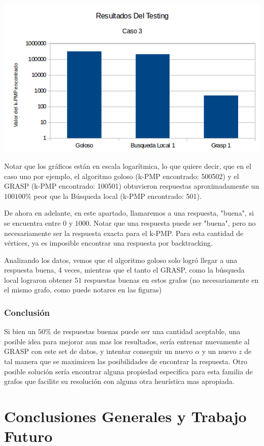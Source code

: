 \includegraphics[scale=0.7]{Con/dificil3.png}

Notar que los gráficos están en escala logarítmica, lo que quiere decir, que en el caso uno por ejemplo, el algoritmo goloso (k-PMP encontrado: 500502) y el GRASP (k-PMP encontrado: 100501) obtuvieron respuestas aproximadamente un $100100 \%$ peor que la Búsqueda local (k-PMP encontrado: 501).

De ahora en adelante, en este apartado, llamaremos a una respuesta, "buena", si se encuentra entre 0 y $1000$. Notar que una respuesta puede ser "buena", pero no necesariamente ser la respuesta exacta para el k-PMP. Para esta cantidad de vértices, ya es imposible encontrar una respuesta por backtracking.

Analizando los datos, vemos que el algoritmo goloso solo logró llegar a una respuesta buena, 4 veces, mientras que el tanto el GRASP, como la búsqueda local lograron obtener $51$ respuestas buenas en estos grafos (no necesariamente en el mismo grafo, como puede notares en las figuras)

\subsubsection{Conclusión}

Si bien un $50 \%$ de respuestas buenas puede ser una cantidad aceptable, una posible idea para mejorar aun mas los resultados, sería entrenar nuevamente al GRASP con este set de datos, y intentar conseguir un nuevo $\alpha$ y un nuevo $z$ de tal manera que se maximicen las posibilidades de encontrar la respuesta. Otro posible solución sería encontrar alguna propiedad especifica para esta familia de grafos que facilite su resolución con alguna otra heurística mas apropiada.

\section{Conclusiones Generales y Trabajo Futuro}

